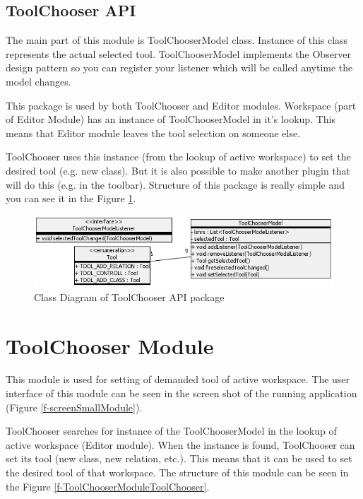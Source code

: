 \subsection{ToolChooser API}

The main part of this module is ToolChooserModel class. Instance of this class represents the actual selected tool. ToolChooserModel implements the Observer design pattern so you can register your listener which will be called anytime the model changes.

This package is used by both ToolChooser and Editor modules. Workspace (part of Editor Module) has an instance of ToolChooserModel in it's lookup. This means that Editor module leaves the tool selection on someone else.

ToolChooser uses this instance (from the lookup of active workspace) to set the desired tool (e.g. new class).  But it is also possible to make another plugin that will do this (e.g. in the toolbar). Structure of this package is really simple and you can see it in the Figure \ref{f-ModuleAPIToolChooserModel}.

\begin{figure}[!ht]
\begin{center}
\includegraphics[width=\textwidth]{img/ModuleAPIToolChooserModel.png}
\caption{Class Diagram of ToolChooser API package}
\label{f-ModuleAPIToolChooserModel}
\end{center}
\end{figure}

\section{ToolChooser Module}
\label{section:toolChooserModule}

This module is used for setting of demanded tool of active workspace. The user interface of this module can be seen in the screen shot of the running application (Figure \ref{f-screenSmallModule}).

ToolChooser searches for instance of the ToolChooserModel in the lookup of active workspace (Editor module). When the instance is found, ToolChooser can set its tool (new class, new relation, etc.). This means that it can be used to set the desired tool of that workspace. The structure of this module can be seen in the Figure \ref{f-ToolChooserModuleToolChooser}.

